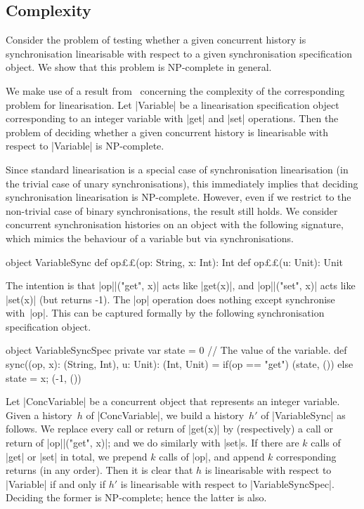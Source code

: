 
\subsection{Complexity}
\label{sec:NP-complete}

Consider the problem of testing whether a given concurrent history is
synchronisation linearisable with respect to a given synchronisation
specification object.  We show that this problem is NP-complete in general.

We make use of a result from~\cite{gibbons-korach} concerning the complexity
of the corresponding problem for linearisation.  Let |Variable| be a
linearisation specification object corresponding to an integer variable with
|get| and |set| operations.  Then the problem of deciding whether a given
concurrent history is linearisable with respect to |Variable| is NP-complete.

Since standard linearisation is a special case of synchronisation
linearisation (in the trivial case of unary synchronisations), this
immediately implies that deciding synchronisation linearisation is
NP-complete.  However, even if we restrict to the non-trivial case of binary
synchronisations, the result still holds.
%
We consider concurrent synchronisation histories on an object with the
following signature, which mimics the behaviour of a variable but via
synchronisations. 
%
\begin{scala}
object VariableSync{
  def op££(op: String, x: Int): Int
  def op££(u: Unit): Unit
} 
\end{scala}
%
The intention is that |op||("get", x)| acts like |get(x)|, and
|op||("set", x)| acts like |set(x)| (but returns -1).  The |op|
operation does nothing except synchronise with~|op|.  This
can be captured formally by the following synchronisation specification
object.
%
\begin{scala}
object VariableSyncSpec{
  private var state = 0   // The value of the variable.
  def sync((op, x): (String, Int), u: Unit): (Int, Unit) = 
    if(op == "get") (state, ()) else{ state = x; (-1, ()) }
}
\end{scala}

Let |ConcVariable| be a concurrent object that represents an integer variable.
Given a history~$h$ of |ConcVariable|, we build a history~$h'$ of
|VariableSync| as follows.  We replace every call or return of |get(x)| by
(respectively) a call or return of |op||("get", x)|; and we do similarly
with |set|s.  If there are $k$ calls of |get| or |set| in total, we prepend
$k$ calls of |op|, and append $k$ corresponding returns (in any order).
%
Then it is clear that $h$ is linearisable with respect to |Variable| if and
only if $h'$ is linearisable with respect to |VariableSyncSpec|.  Deciding the
former is NP-complete; hence the latter is also. 

